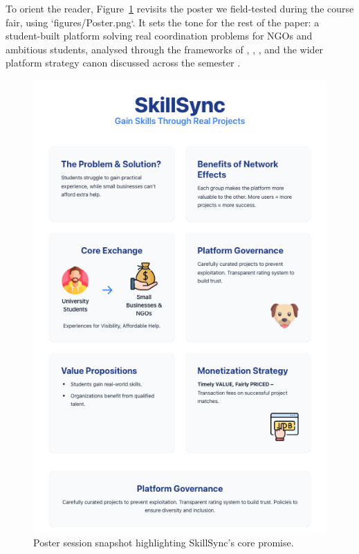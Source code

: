 \documentclass[12pt,a4paper]{article}
\begin{document}
To orient the reader, Figure~\ref{fig:intro-showcase} revisits the poster we field-tested during the course fair, using `figures/Poster.png`. It sets the tone for the rest of the paper: a student-built platform solving real coordination problems for NGOs and ambitious students, analysed through the frameworks of \citet{Choudary2016}, \citet{Srnicek2017}, \citet{Reillier2017}, and the wider platform strategy canon discussed across the semester \citep{Lecture01,Lecture03,Lecture05}.

\begin{figure}[H]
  \centering
  \includegraphics[width=0.7\linewidth]{figures/Poster.png}
  \caption{Poster session snapshot highlighting SkillSync's core promise.}
  \label{fig:intro-showcase}
\end{figure}












\newpage


\end{document}
